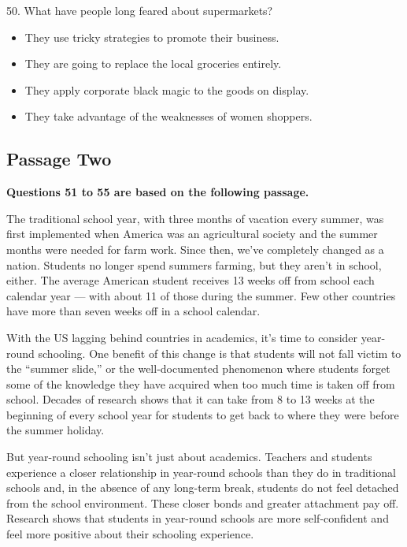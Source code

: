\documentclass[UTF8,11pt]{ctexart}
\begin{document}
50. What have people long feared about supermarkets?


\begin{itemize}[leftmargin=2em,itemsep=.2em,topsep=.4em]\item[A.] They use tricky strategies to promote their business.
\item[B.] They are going to replace the local groceries entirely.
\item[C.] They apply corporate black magic to the goods on display.
\item[D.] They take advantage of the weaknesses of women shoppers.
\end{itemize}

\subsection*{\textbf{Passage Two}}


\textbf{Questions 51 to 55 are based on the following passage.}


The traditional school year, with three months of vacation every summer, was first implemented when America was an agricultural society and the summer months were needed for farm work. Since then, we’ve completely changed as a nation. Students no longer spend summers farming, but they aren’t in school, either. The average American student receives 13 weeks off from school each calendar year — with about 11 of those during the summer. Few other countries have more than seven weeks off in a school calendar.


With the US lagging behind countries in academics, it’s time to consider year-round schooling. One benefit of this change is that students will not fall victim to the “summer slide,” or the well-documented phenomenon where students forget some of the knowledge they have acquired when too much time is taken off from school. Decades of research shows that it can take from 8 to 13 weeks at the beginning of every school year for students to get back to where they were before the summer holiday.


But year-round schooling isn’t just about academics. Teachers and students experience a closer relationship in year-round schools than they do in traditional schools and, in the absence of any long-term break, students do not feel detached from the school environment. These closer bonds and greater attachment pay off. Research shows that students in year-round schools are more self-confident and feel more positive about their schooling experience.
\end{document}
